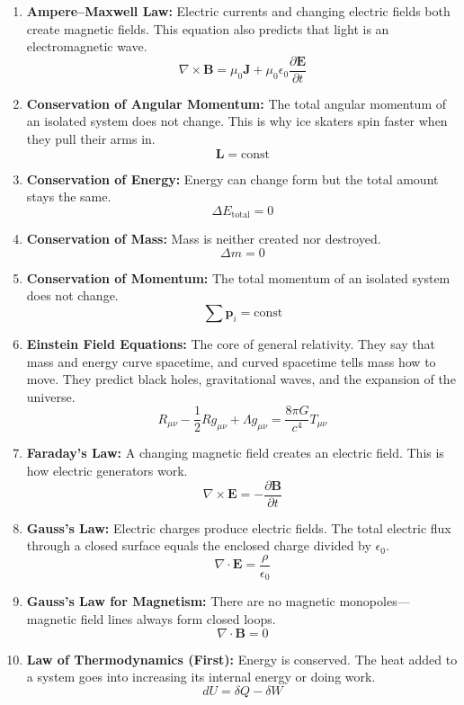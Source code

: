 \documentclass[11pt,openright]{book}
\begin{document}
\begin{enumerate}

\item \textbf{Ampere--Maxwell Law:} Electric currents and changing electric fields both create magnetic fields. This equation also predicts that light is an electromagnetic wave.
\[
\nabla\times\mathbf B=\mu_0\mathbf J+\mu_0\epsilon_0\frac{\partial\mathbf E}{\partial t}
\]

\item \textbf{Conservation of Angular Momentum:} The total angular momentum of an isolated system does not change. This is why ice skaters spin faster when they pull their arms in.
\[
\mathbf L=\text{const}
\]

\item \textbf{Conservation of Energy:} Energy can change form but the total amount stays the same.
\[
\Delta E_{\text{total}}=0
\]

\item \textbf{Conservation of Mass:} Mass is neither created nor destroyed.
\[
\Delta m=0
\]

\item \textbf{Conservation of Momentum:} The total momentum of an isolated system does not change.
\[
\sum\mathbf p_i=\text{const}
\]

\item \textbf{Einstein Field Equations:} The core of general relativity. They say that mass and energy curve spacetime, and curved spacetime tells mass how to move. They predict black holes, gravitational waves, and the expansion of the universe.
\[
R_{\mu\nu}-\frac12Rg_{\mu\nu}+\Lambda g_{\mu\nu}
=\frac{8\pi G}{c^4}T_{\mu\nu}
\]

\item \textbf{Faraday's Law:} A changing magnetic field creates an electric field. This is how electric generators work.
\[
\nabla\times\mathbf E=-\frac{\partial\mathbf B}{\partial t}
\]

\item \textbf{Gauss's Law:} Electric charges produce electric fields. The total electric flux through a closed surface equals the enclosed charge divided by $\epsilon_0$.
\[
\nabla\cdot\mathbf E=\frac{\rho}{\epsilon_0}
\]

\item \textbf{Gauss's Law for Magnetism:} There are no magnetic monopoles---magnetic field lines always form closed loops.
\[
\nabla\cdot\mathbf B=0
\]

\item \textbf{Law of Thermodynamics (First):} Energy is conserved. The heat added to a system goes into increasing its internal energy or doing work.
\[
dU=\delta Q-\delta W
\]


\end{enumerate}
\end{document}
